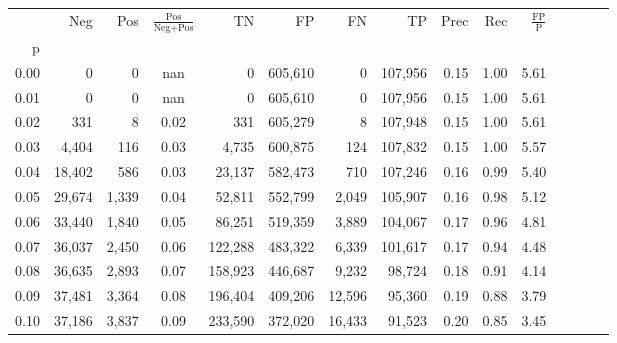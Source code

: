 \begin{tabular}{rrrcrrrrrrrrrrr}
\toprule
{} &     Neg &    Pos & $\frac{\text{Pos}}{\text{Neg}+\text{Pos}}$ &       TN &       FP &       FN &       TP &  Prec &   Rec & $\frac{\text{FP}}{\text{P}}$ \\
p    &         &        &                                            &          &          &          &          &       &       &                              \\
\midrule
0.00 &       0 &      0 &                                        nan &        0 &  605,610 &        0 &  107,956 &  0.15 &  1.00 &                         5.61 \\
0.01 &       0 &      0 &                                        nan &        0 &  605,610 &        0 &  107,956 &  0.15 &  1.00 &                         5.61 \\
0.02 &     331 &      8 &                                       0.02 &      331 &  605,279 &        8 &  107,948 &  0.15 &  1.00 &                         5.61 \\
0.03 &   4,404 &    116 &                                       0.03 &    4,735 &  600,875 &      124 &  107,832 &  0.15 &  1.00 &                         5.57 \\
0.04 &  18,402 &    586 &                                       0.03 &   23,137 &  582,473 &      710 &  107,246 &  0.16 &  0.99 &                         5.40 \\
0.05 &  29,674 &  1,339 &                                       0.04 &   52,811 &  552,799 &    2,049 &  105,907 &  0.16 &  0.98 &                         5.12 \\
0.06 &  33,440 &  1,840 &                                       0.05 &   86,251 &  519,359 &    3,889 &  104,067 &  0.17 &  0.96 &                         4.81 \\
0.07 &  36,037 &  2,450 &                                       0.06 &  122,288 &  483,322 &    6,339 &  101,617 &  0.17 &  0.94 &                         4.48 \\
0.08 &  36,635 &  2,893 &                                       0.07 &  158,923 &  446,687 &    9,232 &   98,724 &  0.18 &  0.91 &                         4.14 \\
0.09 &  37,481 &  3,364 &                                       0.08 &  196,404 &  409,206 &   12,596 &   95,360 &  0.19 &  0.88 &                         3.79 \\
0.10 &  37,186 &  3,837 &                                       0.09 &  233,590 &  372,020 &   16,433 &   91,523 &  0.20 &  0.85 &                         3.45 \\

\end{tabular}
